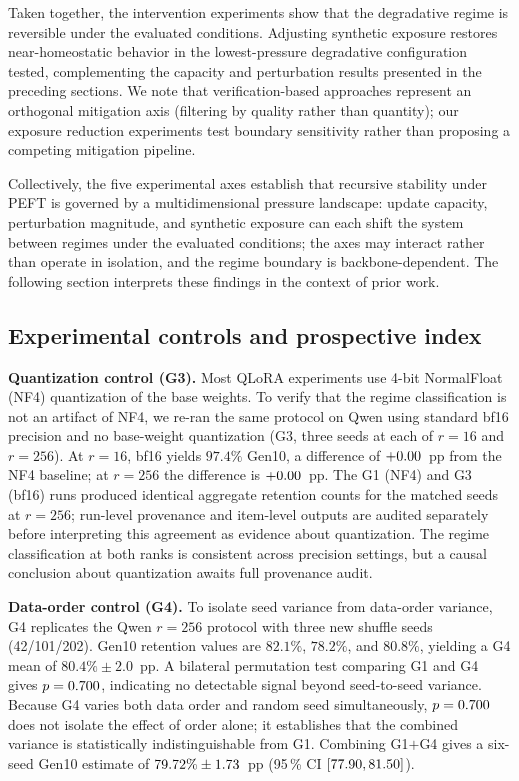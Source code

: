 \documentclass[a4paper,fleqn]{cas-dc}
\newif\ifshowchanges
\newcommand{\rev}[1]{\ifshowchanges{\color{blue}#1}\else{#1}\fi}
\begin{document}
Taken together, the intervention experiments show that the degradative regime is
reversible under the evaluated conditions. Adjusting synthetic exposure restores
near-homeostatic behavior in the \rev{lowest-pressure degradative configuration tested}, complementing the
capacity and perturbation results presented in the preceding sections. We note
that verification-based approaches \citep{yi2025} represent an orthogonal
mitigation axis (filtering by quality rather than quantity); our exposure
reduction experiments test boundary sensitivity rather than proposing a
competing mitigation pipeline.

Collectively, the five experimental axes establish that recursive stability
under PEFT is governed by a multidimensional pressure landscape: update
capacity, perturbation magnitude, and synthetic exposure \rev{can each shift} the system between regimes under the evaluated conditions; the axes may interact rather than operate in isolation, and the regime boundary is backbone-dependent. The following section
interprets these findings in the context of prior work.

\subsection{Experimental controls and prospective index}\label{sec:res_controls}

\rev{\textbf{Quantization control (G3).}
Most QLoRA experiments use 4-bit NormalFloat (NF4) quantization of the base
weights. To verify that the regime classification is not an artifact of NF4, we
re-ran the same protocol on Qwen using standard bf16 precision and no base-weight
quantization (G3, three seeds at each of $r=16$ and $r=256$). At $r=16$, bf16
yields $97.4\%$ Gen10, a difference of $+0.00$~pp from the NF4
baseline; at $r=256$ the difference is $+0.00$~pp.
The G1 (NF4) and G3 (bf16) runs produced identical aggregate retention counts
for the matched seeds at $r=256$; run-level provenance and item-level outputs
are audited separately before interpreting this agreement as evidence about
quantization. The regime classification at both ranks is consistent across
precision settings, but a causal conclusion about quantization awaits full
provenance audit.}

\rev{\textbf{Data-order control (G4).}
To isolate seed variance from data-order variance, G4 replicates the Qwen
$r=256$ protocol with three new shuffle seeds (42/101/202). Gen10 retention
values are $82.1\%$, $78.2\%$, and $80.8\%$, yielding a G4 mean of $80.4\%\pm2.0$~pp.
A bilateral permutation test comparing G1 and G4 gives $p=0.700$, indicating
no detectable signal beyond seed-to-seed variance. Because G4 varies both data
order and random seed simultaneously, $p=0.700$ does not isolate the
effect of order alone; it establishes that the combined variance is
statistically indistinguishable from G1. Combining G1$+$G4 gives a six-seed
Gen10 estimate of $79.72\%\pm1.73$~pp
(95\,\% CI $[77.90, 81.50]$).}
\end{document}
